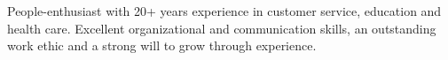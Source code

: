 

\begin{cvparagraph}

People-enthusiast with 20+ years experience in customer service, education and health care. Excellent organizational and communication skills, an outstanding work ethic and a strong will to grow through experience.
\end{cvparagraph}
